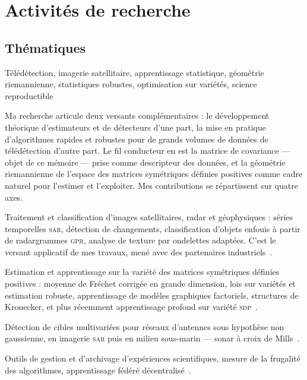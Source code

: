 \section{Activités de recherche}
\label{sec:cv-recherche}

\subsection{Thématiques}
\label{subsec:cv-thematiques}

\begin{cvfields}
  \item[Mots-clés] Télédétection, imagerie satellitaire, apprentissage
    statistique, géométrie riemannienne, statistiques robustes, optimisation
    sur variétés, science reproductible
\end{cvfields}

\medskip

Ma recherche articule deux versants complémentaires : le développement théorique
d'estimateurs et de détecteurs d'une part, la mise en pratique d'algorithmes
rapides et robustes pour de grands volumes de données de télédétection d'autre
part. Le fil conducteur en est la matrice de covariance --- objet de ce mémoire
--- prise comme descripteur des données, et la géométrie riemannienne de
l'espace des matrices symétriques définies positives comme cadre naturel pour
l'estimer et l'exploiter. Mes contributions se répartissent sur quatre axes.

\begin{cvfields}
  \item[Télédétection] Traitement et classification d'images satellitaires,
    radar et géophysiques : séries temporelles \textsc{sar}, détection de
    changements, classification d'objets enfouis à partir de radargrammes
    \textsc{gpr}, analyse de texture par ondelettes adaptées. C'est le versant
    applicatif de mes travaux, mené avec des partenaires
    industriels~.
  \item[Géométrie riemannienne] Estimation et apprentissage sur la variété des
    matrices symétriques définies positives : moyenne de Fréchet corrigée en
    grande dimension, lois sur variétés et estimation robuste, apprentissage de
    modèles graphiques factoriels, structures de Kronecker, et plus récemment
    apprentissage profond sur variété
    \textsc{sdp}~.
  \item[Estimation et détection] Détection de cibles multivariées pour réseaux
    d'antennes sous hypothèse non gaussienne, en imagerie \textsc{sar} puis en
    milieu sous-marin --- sonar à croix de
    Mills~.
  \item[Frugalité] Outils de gestion et d'archivage d'expériences
    scientifiques, mesure de la frugalité des algorithmes, apprentissage
    fédéré décentralisé~.
\end{cvfields}


